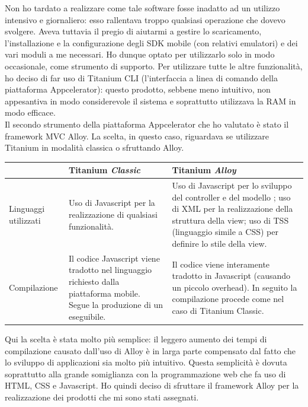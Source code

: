 				Non ho tardato a realizzare come tale software fosse inadatto ad un utilizzo intensivo e giornaliero: esso rallentava
				troppo qualsiasi operazione che dovevo svolgere. Aveva tuttavia il pregio di aiutarmi a gestire lo scaricamento,
				l'installazione e la configurazione degli SDK mobile (con relativi emulatori) e dei vari moduli a me necessari. Ho
				dunque optato per utilizzarlo solo in modo occasionale, come strumento di supporto. Per utilizzare tutte le altre
				funzionalità, ho deciso di far uso di Titanium CLI (l'interfaccia a linea di comando della piattaforma Appcelerator):
				questo prodotto, sebbene meno intuitivo, non appesantiva in modo considerevole il sistema e soprattutto utilizzava la
				RAM in modo efficace.\\
				Il secondo strumento della piattaforma Appcelerator che ho valutato è stato il framework MVC Alloy. La scelta, in
				questo caso, riguardava se utilizzare Titanium in modalità classica o sfruttando Alloy.
				\begin{center}
					\begin{tabular}[H]{| p{} | p{0.35\textwidth} | p{} |}
						\hline
						&
						Titanium \emph{Classic}&
						Titanium \emph{Alloy}\\
						\hline\hline
						Linguaggi utilizzati &
						Uso di Javascript per la realizzazione di qualsiasi funzionalità. &
						Uso di Javascript per lo sviluppo del controller e del modello ; uso di XML per la realizzazione
						della struttura della view; uso di TSS (linguaggio simile a CSS) per definire lo stile della view.\\
						\hline
						Compilazione &
						Il codice Javascript viene tradotto nel linguaggio richiesto dalla piattaforma mobile. Segue la
						produzione di un eseguibile. &
						Il codice viene interamente tradotto in Javascript (causando un piccolo overhead). In seguito la
						compilazione procede come nel caso di Titanium Classic.\\
						\hline
					\end{tabular}
				\end{center}
				Qui la scelta è	stata molto più semplice: il leggero aumento dei tempi di compilazione causato dall'uso di Alloy
				è in larga parte compensato dal fatto che lo sviluppo di applicazioni sia molto più intuitivo. Questa semplicità è
				dovuta soprattutto alla grande somiglianza con la programmazione web che fa uso di HTML, CSS e Javascript. Ho quindi
				deciso di sfruttare il framework Alloy per la realizzazione dei prodotti che mi sono stati assegnati.\\
